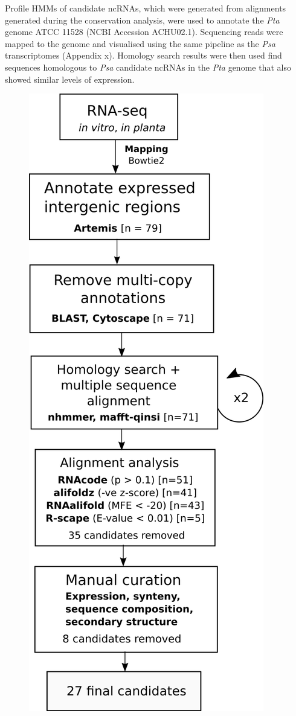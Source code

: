 Profile HMMs of candidate ncRNAs, which were generated from alignments generated during the conservation analysis, were used to annotate the \textit{Pta} genome ATCC 11528 (NCBI Accession ACHU02.1). Sequencing reads were mapped to the genome and visualised using the same pipeline as the \textit{Psa} transcriptomes (Appendix x). Homology search results were then used find sequences homologous to \textit{Psa} candidate ncRNAs in the \textit{Pta} genome that also showed similar levels of expression. 
\begin{figure}[H]
\begin{minipage}{0.6\textwidth}
    \includegraphics[scale=1]{psa/psa_ncRNA/flowchart3.png}

\end{minipage}
\end{figure}

